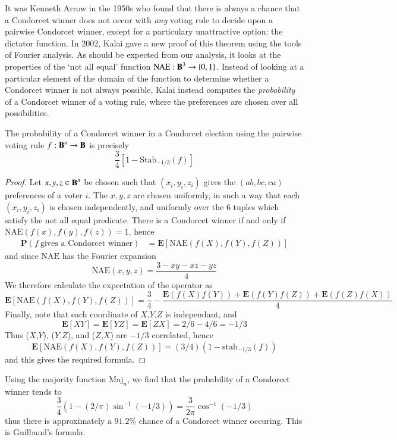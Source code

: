 It was Kenneth Arrow in the 1950s who found that there is always a chance that a Condorcet winner does not occur with {\it any} voting rule to decide upon a pairwise Condorcet winner, except for a particulary unattractive option: the dictator function. In 2002, Kalai gave a new proof of this theorem using the tools of Fourier analysis. As should be expected from our analysis, it looks at the properties of the `not all equal' function $\text{NAE}: \operatorname{\mathbf{B}}^3 \to \{ 0, 1 \}$. Instead of looking at a particular element of the domain of the function to determine whether a Condorcet winner is not always possible, Kalai instead computes the {\it probability} of a Condorcet winner of a voting rule, where the preferences are chosen over all possibilities. 

\begin{lemma}
    The probability of a Condorcet winner in a Condorcet election using the pairwise voting rule $f: \operatorname{\mathbf{B}}^n \to \operatorname{\mathbf{B}}$ is precisely
    \[ \frac{3}{4} [1 - \text{Stab}_{-1/3}(f)] \]
\end{lemma}
\begin{proof}
    Let $x,y,z \in \operatorname{\mathbf{B}}^n$ be chosen such that $(x_i,y_i,z_i)$ gives the $(ab,bc,ca)$ preferences of a voter $i$. The $x,y,z$ are chosen uniformly, in such a way that each $(x_i,y_i,z_i)$ is chosen independently, and uniformly over the 6 tuples which satisfy the not all equal predicate. There is a Condorcet winner if and only if $\text{NAE}(f(x),f(y),f(z)) = 1$, hence
    \begin{align*}
        \mathbf{P}(f\ \text{gives a Condorcet winner}) &= \mathbf{E}[\text{NAE}(f(X),f(Y),f(Z))]
    \end{align*}
    and since $\text{NAE}$ has the Fourier expansion
    \[ \text{NAE}(x,y,z) = \frac{3 - xy - xz - yz}{4} \]
    We therefore calculate the expectation of the operator as
    \[ \mathbf{E}[\text{NAE}(f(X),f(Y),f(Z))] = \frac{3}{4} - \frac{\mathbf{E}(f(X)f(Y)) + \mathbf{E}(f(Y)f(Z)) + \mathbf{E}(f(Z)f(X))}{4} \]
    Finally, note that each coordinate of $X$,$Y$,$Z$ is independant, and
    \[ \mathbf{E}[XY] = \mathbf{E}[YZ] = \mathbf{E}[ZX] = 2/6 - 4/6 = -1/3 \]
    Thus ($X$,$Y$), ($Y$,$Z$), and ($Z$,$X$) are $-1/3$ correlated, hence
    \[ \mathbf{E}[\text{NAE}(f(X),f(Y),f(Z))] = (3/4)(1 - \text{stab}_{-1/3}(f)) \]
    and this gives the required formula.
\end{proof}

\begin{example}
    Using the majority function $\text{Maj}_n$, we find that the probability of a Condorcet winner tends to
    \[ \frac{3}{4}(1 - (2/\pi) \sin^{-1}(-1/3)) = \frac{3}{2\pi} \cos^{-1}(-1/3) \]
    thus there is approximately a $91.2\%$ chance of a Condorcet winner occuring. This is Guilbaud's formula.
\end{example}

